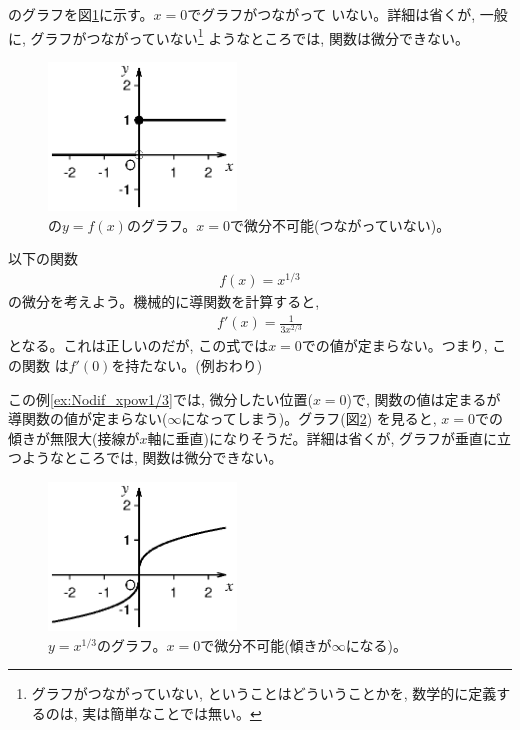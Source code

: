 のグラフを図\ref{fig:step_func01}に示す。$x=0$でグラフがつながって
いない。詳細は省くが, 一般に, グラフがつながっていない\footnote{グラフがつながっていない, 
ということはどういうことかを, 数学的に定義するのは, 実は簡単なことでは無い。}
ようなところでは, 関数は微分できない。

\begin{figure}[h]
    \centering
    \includegraphics[width=5cm]{step_func01.eps}
    \caption{の$y=f(x)$のグラフ。$x=0$で微分不可能(つながっていない)。}\label{fig:step_func01}
\end{figure}



\begin{exmpl}\label{ex:Nodif_xpow1/3} 以下の関数
\begin{eqnarray*}
f(x)=x^{1/3}
\end{eqnarray*}
の微分を考えよう。機械的に導関数を計算すると, 
\begin{eqnarray}f'(x)=\frac{1}{3x^{2/3}}\label{eq:xpow1/3'}\end{eqnarray}
となる。これは正しいのだが, この式では$x=0$での値が定まらない。つまり, この関数
は$f'(0)$を持たない。(例おわり)
\end{exmpl}

この例\ref{ex:Nodif_xpow1/3}では, 微分したい位置($x=0$)で, 関数の値は定まるが
導関数の値が定まらない($\infty$になってしまう)。グラフ(図\ref{fig:xpow1_3})
を見ると, $x=0$での傾きが無限大(接線が$x$軸に垂直)になりそうだ。詳細は省くが, 
グラフが垂直に立つようなところでは, 関数は微分できない。

\begin{figure}[h]
    \centering
    \includegraphics[width=5cm]{xpow1_3.eps}
    \caption{$y=x^{1/3}$のグラフ。$x=0$で微分不可能(傾きが$\infty$になる)。}\label{fig:xpow1_3}
\end{figure}

